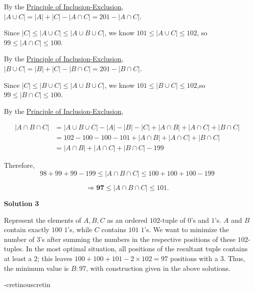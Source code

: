 \begin{enumerate}
 
By the \href{https://artofproblemsolving.com/wiki/index.php?title=Principle\_of\_Inclusion-Exclusion}{Principle of Inclusion-Exclusion}, $|A \cup C| = |A| + |C| - |A \cap C| = 201 - |A \cap C|.$

 Since $|C| \le |A \cup C| \le |A \cup B \cup C|$, we know $101 \le |A \cup C| \le 102$, so $99 \le |A \cap C| \le 100.$

 
By the \href{https://artofproblemsolving.com/wiki/index.php?title=Principle\_of\_Inclusion-Exclusion}{Principle of Inclusion-Exclusion}, $|B \cup C| = |B| + |C| - |B \cap C| = 201 - |B \cap C|.$

 Since $|C| \le |B \cup C| \le |A \cup B \cup C|$, we know $101 \le |B \cup C| \le 102$,so $99 \le |B \cap C| \le 100.$

 
By the \href{https://artofproblemsolving.com/wiki/index.php?title=Principle\_of\_Inclusion-Exclusion}{Principle of Inclusion-Exclusion}, 

 \begin{align}|A \cap B \cap C| &= |A \cup B \cup C| - |A| - |B| - |C| + |A \cap B| + |A \cap C| + |B \cap C| \\&= 102 - 100 - 100 - 101 + |A \cap B| + |A \cap C| + |B \cap C| \\&= |A \cap B| + |A \cap C| + |B \cap C| - 199\end{align}

 
Therefore,
 \[98 + 99 + 99 - 199 \le |A \cap B \cap C| \le 100+100+100-199\]

 \[\Rightarrow \boxed{\textbf{97}} \le |A \cap B \cap C| \le 101.\]




\textbf{Solution 3}

Represent the elements of $A, B, C$ as an ordered $102$-tuple of $0$'s and $1$'s. $A$ and $B$ contain exactly $100$ $1$'s, while $C$ contains $101$ $1$'s. We want to minimize the number of $3$'s after summing the numbers in the respective positions of these $102$-tuples. In the most optimal situation, all positions of the resultant tuple contains at least a $2$; this leaves $100+100+101-2\times102=97$ positions with a $3$. Thus, the minimum value is $\boxed{B: 97}$, with construction given in the above solutions.

 -cretinouscretin

 


\end{enumerate}